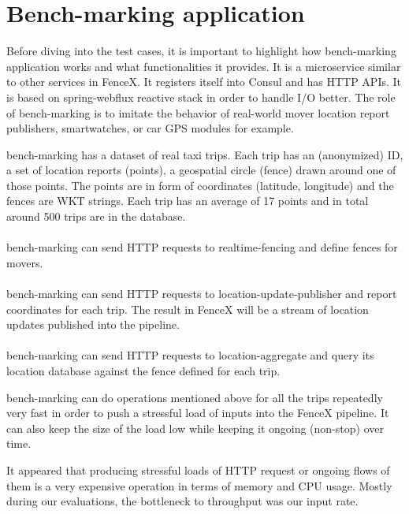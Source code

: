 \documentclass[a4]{report}
\begin{document}
    \section{Bench-marking application}
    Before diving into the test cases, it is important to highlight how bench-marking application works and what
    functionalities it provides.
    It is a microservice similar to other services in FenceX.
    It registers itself into Consul and has HTTP APIs.
    It is based on spring-webflux\cite{webflux} reactive stack in order to handle I/O better.
    The role of bench-marking is to imitate the behavior of real-world mover location report publishers,
    smartwatches, or car GPS modules for example.

    bench-marking has a dataset of real taxi trips.
    Each trip has an (anonymized) ID, a set of location reports (points), a geospatial circle (fence) drawn around one of those points.
    The points are in form of coordinates (latitude, longitude) and the fences are WKT strings.
    Each trip has an average of 17 points and in total around 500 trips are in the database.

    \paragraph{}
    bench-marking can send HTTP requests to realtime-fencing and define fences for movers.

    \paragraph{}
    bench-marking can send HTTP requests to location-update-publisher and report coordinates for each trip.
    The result in FenceX will be a stream of location updates published into the pipeline.

    \paragraph{}
    bench-marking can send HTTP requests to location-aggregate and query its location database against the fence
    defined for each trip.

    bench-marking can do operations mentioned above for all the trips repeatedly very fast in order to push a
    stressful load of inputs into the FenceX pipeline.
    It can also keep the size of the load low while keeping it ongoing (non-stop) over time.

    It appeared that producing stressful loads of HTTP request or ongoing flows of them is a very expensive operation
    in terms of memory and CPU usage.
    Mostly during our evaluations, the bottleneck to throughput was our input rate.
\end{document}
